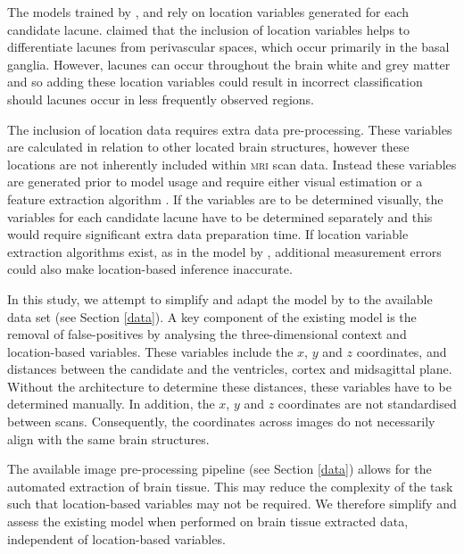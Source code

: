 The models trained by \cite{UchiyamaYoshikazu2007Ioad}, \cite{Yokoyama2007} and \cite{GhafoorianM.2017Dml3} rely on location variables generated for each candidate lacune. \cite{GhafoorianM.2017Dml3} claimed that the inclusion of location variables helps to differentiate lacunes from perivascular spaces, which occur primarily in the basal ganglia. However, lacunes can occur throughout the brain white and grey matter \citep{WardlawJm2013Mosc} and so adding these location variables could result in incorrect classification should lacunes occur in less frequently observed regions.

The inclusion of location data requires extra data pre-processing. These variables are calculated in relation to other located brain structures, however these locations are not inherently included within \textsc{mri} scan data. Instead these variables are generated prior to model usage and require either visual estimation or a feature extraction algorithm \citep{Uchiyama2007b, UchiyamaYoshikazu2007Ioad}. If the variables are to be determined visually, the variables for each candidate lacune have to be determined separately and this would require significant extra data preparation time. If location variable extraction algorithms exist, as in the model by \cite{UchiyamaYoshikazu2007Ioad}, additional measurement errors could also make location-based inference inaccurate.

In this study, we attempt to simplify and adapt the model by \cite{GhafoorianM.2017Dml3} to the available data set (see Section \ref{data}). A key component of the existing model is the removal of false-positives by analysing the three-dimensional context and location-based variables. These variables include the $x$, $y$ and $z$ coordinates, and distances between the candidate and the ventricles, cortex and midsagittal plane. Without the architecture to determine these distances, these variables have to be determined manually. In addition, the  $x$, $y$ and $z$ coordinates are not standardised between scans. Consequently, the coordinates across images do not necessarily align with the same brain structures.

The available image pre-processing pipeline (see Section \ref{data}) allows for the automated extraction of brain tissue. This may reduce the complexity of the task such that location-based variables may not be required. We therefore simplify and assess the existing model when performed on brain tissue extracted data, independent of location-based variables.



